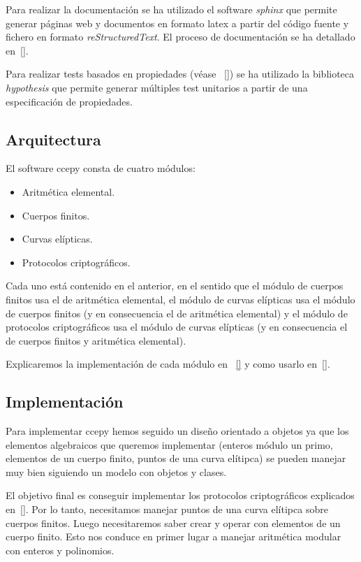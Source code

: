 Para realizar la documentación se ha utilizado el software \emph{sphinx} que permite generar páginas web y documentos en formato latex a partir del código fuente y fichero en formato \emph{reStructuredText}. El proceso de documentación se ha detallado en~\ref{}.

Para realizar tests basados en propiedades (véase ~\ref{}) se ha utilizado la biblioteca \emph{hypothesis} que permite generar múltiples test unitarios a partir de una especificación de propiedades.

\subsection{Arquitectura}
\label{sub:Arquitectura}

El software ccepy consta de cuatro módulos:

\begin{itemize}
    \item Aritmética elemental.
    \item Cuerpos finitos.
    \item Curvas elípticas.
    \item Protocolos criptográficos.
\end{itemize}

Cada uno está contenido en el anterior, en el sentido que el módulo de cuerpos finitos usa el de aritmética elemental, el módulo de curvas elípticas usa el módulo de cuerpos finitos (y en consecuencia el de aritmética elemental) y el módulo de protocolos criptográficos usa el módulo de curvas elípticas (y en consecuencia el de cuerpos finitos y aritmética elemental).

Explicaremos la implementación de cada módulo en ~\ref{} y como usarlo en~\ref{}.

\subsection{Implementación}
\label{sub:Implementación}

Para implementar ccepy hemos seguido un diseño orientado a objetos ya que los elementos algebraicos que queremos implementar (enteros módulo un primo, elementos de un cuerpo finito, puntos de una curva elítipca) se pueden manejar muy bien siguiendo un modelo con objetos y clases.

El objetivo final es conseguir implementar los protocolos criptográficos explicados en~\ref{}. Por lo tanto, necesitamos manejar puntos de una curva elítipca sobre cuerpos finitos. Luego necesitaremos saber crear y operar con elementos de un cuerpo finito. Esto nos conduce en primer lugar a manejar aritmética modular con enteros y polinomios.

